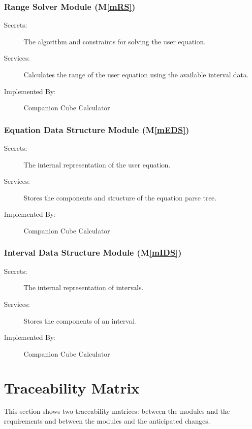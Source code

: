 \documentclass[12pt, titlepage]{article}
\newcommand{\mref}[1]{M\ref{#1}}
\newcommand{\progname}{Companion Cube Calculator} %
\begin{document}
\subsubsection{Range Solver Module (\mref{mRS})}

\begin{description}
	\item[Secrets:]The algorithm and constraints for solving the user equation.
	\item[Services:]Calculates the range of the user equation using the 
	available interval data.
	\item[Implemented By:] \progname{}
\end{description}

\subsubsection{Equation Data Structure Module (\mref{mEDS})}

\begin{description}
	\item[Secrets:]The internal representation of the user equation.
	\item[Services:]Stores the components and structure of the equation parse 
	tree.
	\item[Implemented By:] \progname{}
\end{description}

\subsubsection{Interval Data Structure Module (\mref{mIDS})}

\begin{description}
	\item[Secrets:]The internal representation of intervals.
	\item[Services:]Stores the components of an interval.
	\item[Implemented By:] \progname{}
\end{description}

\section{Traceability Matrix} \label{SecTM}

This section shows two traceability matrices: between the modules and the
requirements and between the modules and the anticipated changes.
\end{document}
